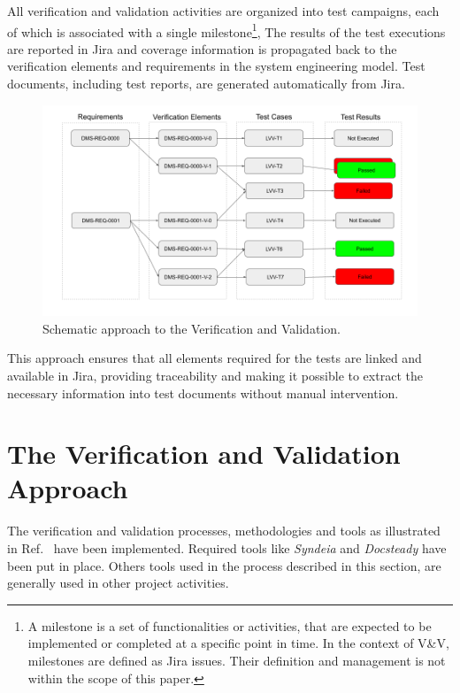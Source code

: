 All verification and validation activities are organized into test campaigns, each of which is associated with a single milestone\footnote{A milestone is a set of functionalities or activities, that are expected to be implemented or completed at a specific point in time. In the context of V\&V, milestones are defined as Jira issues. Their definition and management is not within the scope of this paper.},
The results of the test executions are reported in Jira and coverage information is propagated back to the verification elements and requirements in the system engineering model.
Test documents, including test reports, are generated automatically from Jira.
\begin{figure}
\begin{center}
\includegraphics[width=\textwidth]{imgs/VandVSchema.png}
 \caption{Schematic approach to the Verification and Validation.}
 \label{fig:vandvschema}
\end{center}
\end{figure}
This approach ensures that all elements required for the tests are linked and available in Jira, providing traceability and making it possible to extract the necessary information into test documents without manual intervention.


\section{The Verification and Validation Approach}
\label{sec:approach}

The verification and validation processes, methodologies and tools as illustrated in  Ref.~  have been implemented.
Required tools like \textit{Syndeia} and \textit{Docsteady} have been put in place.
Others tools used in the process described in this section, are generally used in other project activities.

